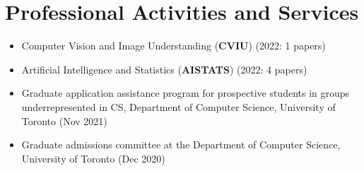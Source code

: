 \section*{Professional Activities and Services}
\vspace{\postsubhead}
\begin{adjustwidth}{\indentleft}{\indentright}
  \begin{itemize}
    \item Computer Vision and Image Understanding (\textbf{CVIU}) (2022: 1 papers)
    \item Artificial Intelligence and Statistics (\textbf{AISTATS}) (2022: 4 papers)
    \item Graduate application assistance program for prospective students in groups underrepresented in CS, Department of Computer Science, University of Toronto (Nov 2021)
    \item Graduate admissions committee at the Department of Computer Science, University of Toronto (Dec 2020)
    
  \end{itemize}
\end{adjustwidth}
